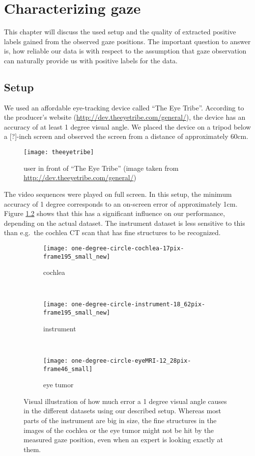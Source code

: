 \chapter{Characterizing gaze}
\label{chap:characterizing-gaze}
This chapter will discuss the used setup and the quality of extracted positive labels gained from the observed gaze positions. The important question to answer is, how reliable our data is with respect to the assumption that gaze observation can naturally provide us with positive labels for the data. 

\section{Setup}
We used an affordable eye-tracking device called ``The Eye Tribe''. According to the producer's website (\url{http://dev.theeyetribe.com/general/}), the device has an accuracy of at least 1 degree visual angle. We placed the device on a tripod below a [?]-inch screen  and observed the screen from a distance of approximately 60cm. 

\begin{figure}[ht]
	\centering

	\texttt{[image: theeyetribe]}	
	\caption{user in front of ``The Eye Tribe'' (image taken from \url{http://dev.theeyetribe.com/general/})}
	\label{fig:theeyetribe}
\end{figure}

The video sequences were played on full screen. In this setup, the minimum accuracy of 1 degree corresponds to an on-screen error of approximately 1cm. Figure \ref{fig:onedegreecircle} shows that this has a significant influence on our performance, depending on the actual dataset. The instrument dataset is less sensitive to this than e.g.\ the cochlea CT scan that has fine structures to be recognized.

\begin{figure}[ht]
	\centering
	\begin{subfigure}[h]{0.31\textwidth}
		\texttt{[image: one-degree-circle-cochlea-17pix-frame195\_small\_new]}	
		\caption*{cochlea}
	\end{subfigure}
	~
	\begin{subfigure}[h]{0.31\textwidth}
		\texttt{[image: one-degree-circle-instrument-18\_62pix-frame195\_small\_new]}	
		\caption*{instrument}
	\end{subfigure}
	~
	\begin{subfigure}[h]{0.31\textwidth}
		\texttt{[image: one-degree-circle-eyeMRI-12\_28pix-frame46\_small]}	
		\caption*{eye tumor}
	\end{subfigure}
	\caption{Visual illustration of how much error a 1 degree visual angle causes in the different datasets using our described setup. Whereas most parts of the instrument are big in size, the fine structures in the images of the cochlea or the eye tumor might not be hit by the measured gaze position, even when an expert is looking exactly at them.}
	\label{fig:onedegreecircle}
\end{figure}


